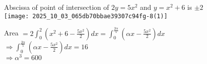 \documentclass[10pt]{article}
\begin{document}
Abscissa of point of intersection of \(2 y=5 x^{2}\) and \(y=x^{2}+6\) is \(\pm 2\)\\
\texttt{[image: 2025\_10\_03\_065db70bbae39307c94fg-8(1)]}

Area \(=2 \int_{0}^{2}\left(x^{2}+6-\frac{5 x^{2}}{2}\right) d x=\int_{0}^{\frac{2 \alpha}{5}}\left(\alpha x-\frac{5 x^{2}}{2}\right) d x\)\\
\(\Rightarrow \int_{0}^{\frac{2 \alpha}{5}}\left(\alpha x-\frac{5 x^{2}}{2}\right) d x=16\)\\
\(\Rightarrow \alpha^{3}=600\)
\end{document}

